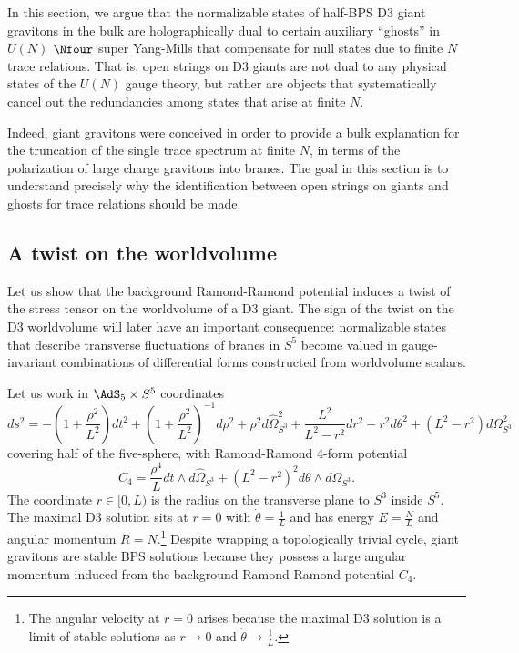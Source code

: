 \documentclass[a4paper,12pt]{article}
\begin{document}
In this section, we argue that the normalizable states of half-BPS D3 giant gravitons in the bulk are holographically dual to certain auxiliary ``ghosts'' in $U(N)$ $\Nfour$ super Yang-Mills that compensate for null states due to finite $N$ trace relations. That is, open strings on D3 giants are not dual to any physical states of the $U(N)$ gauge theory, but rather are objects that systematically cancel out the redundancies among states that arise at finite $N$.

Indeed, giant gravitons were conceived in order to provide a bulk explanation for the truncation of the single trace spectrum at finite $N$, in terms of the polarization of large charge gravitons into branes. The goal in this section is to understand precisely why the identification between open strings on giants and ghosts for trace relations should be made.


\subsection{A twist on the worldvolume} \label{subsec:twistworldvolume}

Let us show that the background Ramond-Ramond potential induces a twist of the stress tensor on the worldvolume of a D3 giant. The sign of the twist on the D3 worldvolume will later have an important consequence: normalizable states that describe transverse fluctuations of branes in $S^5$ become valued in gauge-invariant combinations of differential forms constructed from worldvolume scalars.

Let us work in $\AdS_5 \times S^5$ coordinates
\begin{equation}
ds^2 = -\left( 1 + \frac{\rho^2}{L^2} \right) dt^2 + \left( 1 + \frac{\rho^2}{L^2} \right)^{-1} d\rho^2 + \rho^2 d\hat{\Omega}_{S^3}^2 + \frac{L^2}{L^2 - r^2} dr^2 + r^2 d\theta^2 + (L^2 - r^2) d\Omega_{S^3}^2
\end{equation}
covering half of the five-sphere, with Ramond-Ramond 4-form potential
\begin{equation}
C_4 = \frac{\rho^4}{L} dt \wedge d\hat{\Omega}_{S^3} + (L^2 - r^2)^2 d\theta \wedge d\Omega_{S^3}.
\end{equation}
The coordinate $r \in [0, L)$ is the radius on the transverse plane to $S^3$ inside $S^5$. The maximal D3 solution sits at $r=0$ with $\dot\theta = \frac{1}{L}$ and has energy $E = \frac{N}{L}$ and angular momentum $R = N$.\footnote{The angular velocity at $r=0$ arises because the maximal D3 solution is a limit of stable solutions as $r \to 0$ and $\dot\theta \to \frac{1}{L}$.} Despite wrapping a topologically trivial cycle, giant gravitons are stable BPS solutions because they possess a large angular momentum induced from the background Ramond-Ramond potential $C_4$.
\end{document}
